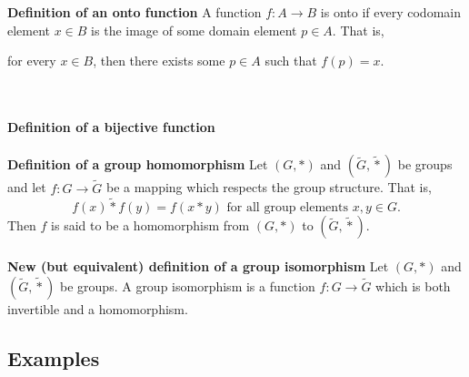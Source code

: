 \documentclass[12 pt]{article}
\numberwithin{equation}{section}
\begin{document}
\
\\
\\
\textbf{Definition of an onto function} A function $f: A \rightarrow B$ is onto if every codomain element $x \in B$ is the image of some domain element $p \in A$. That is,
\begin{center}
for every $x \in B$, then there exists some $p \in A$ such that $f(p) = x$.
\end{center}
\
\\
\\
\textbf{Definition of a bijective function}
\
\\
\\
\textbf{Definition of a group homomorphism} Let $(G, *)$ and $(\tilde{G}, \tilde{*})$ be groups and let $f: G \rightarrow \tilde{G}$ be a mapping which respects the group structure. That is, \begin{equation*}
f(x) \tilde{*} f(y) = f(x*y) \mbox{ for all group elements } x,y \in G .
\end{equation*}
Then $f$ is said to be a homomorphism from $(G,*)$ to $(\tilde{G}, \tilde{*})$.
\
\\
\\
\textbf{New (but equivalent) definition of a group isomorphism} Let $(G, *)$ and $(\tilde{G}, \tilde{*})$ be groups. A group isomorphism is a function $f: G \rightarrow \tilde{G}$ which is both invertible and a homomorphism.














\subsection{Examples}
\end{document}
